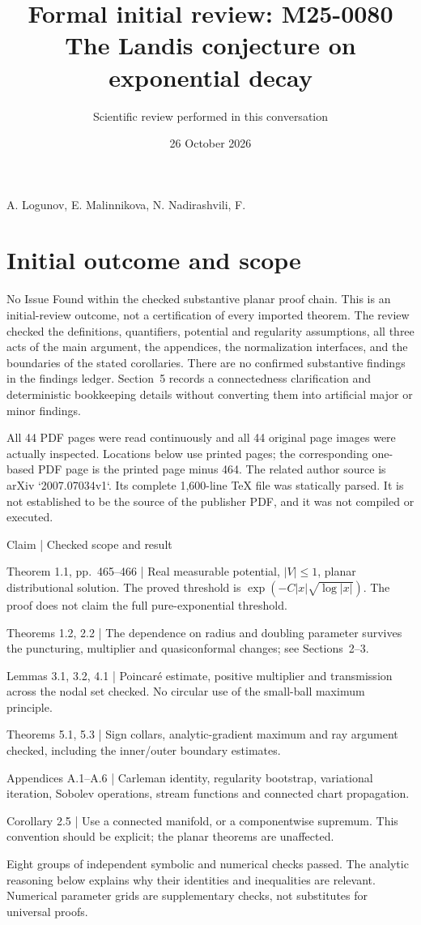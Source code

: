 \documentclass[10pt]{article}
\title{Formal initial review: M25-0080
The Landis conjecture on exponential decay}
\author{Scientific review performed in this conversation}
\date{26 October 2026}
\begin{document}
\maketitle
A. Logunov, E. Malinnikova, N. Nadirashvili, F.\par
\section*{Initial outcome and scope}
No Issue Found within the checked substantive planar proof chain. This is an initial-review outcome, not a certification of every imported theorem. The review checked the definitions, quantifiers, potential and regularity assumptions, all three acts of the main argument, the appendices, the normalization interfaces, and the boundaries of the stated corollaries. There are no confirmed substantive findings in the findings ledger. Section 5 records a connectedness clarification and deterministic bookkeeping details without converting them into artificial major or minor findings.\par
All 44 PDF pages were read continuously and all 44 original page images were actually inspected. Locations below use printed pages; the corresponding one-based PDF page is the printed page minus 464. The related author source is arXiv `2007.07034v1`. Its complete 1,600-line TeX file was statically parsed. It is not established to be the source of the publisher PDF, and it was not compiled or executed.\par
Claim | Checked scope and result\par
Theorem 1.1, pp. 465–466 | Real measurable potential, \(|V|\le1\), planar distributional solution. The proved threshold is \(\exp(-C|x|\sqrt{\log|x|})\). The proof does not claim the full pure-exponential threshold.\par
Theorems 1.2, 2.2 | The dependence on radius and doubling parameter survives the puncturing, multiplier and quasiconformal changes; see Sections 2–3.\par
Lemmas 3.1, 3.2, 4.1 | Poincaré estimate, positive multiplier and transmission across the nodal set checked. No circular use of the small-ball maximum principle.\par
Theorems 5.1, 5.3 | Sign collars, analytic-gradient maximum and ray argument checked, including the inner/outer boundary estimates.\par
Appendices A.1–A.6 | Carleman identity, regularity bootstrap, variational iteration, Sobolev operations, stream functions and connected chart propagation.\par
Corollary 2.5 | Use a connected manifold, or a componentwise supremum. This convention should be explicit; the planar theorems are unaffected.\par
Eight groups of independent symbolic and numerical checks passed. The analytic reasoning below explains why their identities and inequalities are relevant. Numerical parameter grids are supplementary checks, not substitutes for universal proofs.\par
\end{document}
